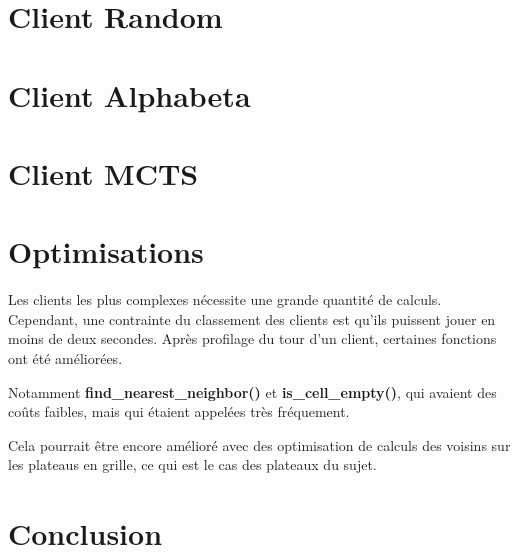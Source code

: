 \documentclass{article}
\begin{document}
\section{Client Random}
\section{Client Alphabeta}
\section{Client MCTS}

\section{Optimisations}
Les clients les plus complexes n\'ecessite une grande quantit\'e de calculs.
Cependant, une contrainte du classement des clients est qu'ils puissent jouer en moins de deux secondes.
Apr\`es profilage du tour d'un client, certaines fonctions ont \'et\'e am\'elior\'ees.

Notamment \textbf{find\_nearest\_neighbor()} et \textbf{is\_cell\_empty()}, qui avaient des co\^uts faibles, 
mais qui \'etaient appel\'ees tr\`es fr\'equement.

Cela pourrait \^etre encore am\'elior\'e avec des 
optimisation de calculs des voisins sur les plateaus en grille, 
ce qui est le cas des plateaux du sujet.


\section{Conclusion}
\end{document}

